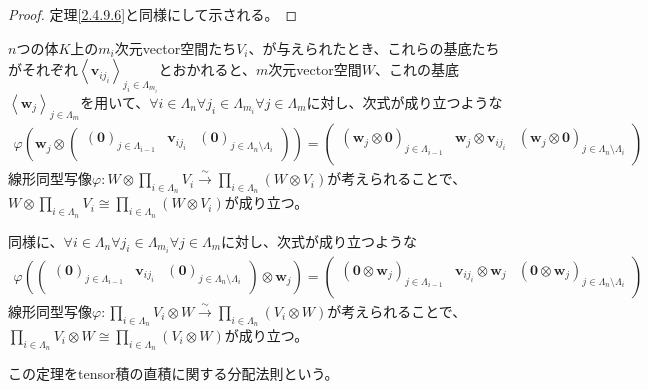 \documentclass[dvipdfmx]{jsarticle}
\begin{document}
\begin{proof} 定理\ref{2.4.9.6}と同様にして示される。
\end{proof}
\begin{thm}[tensor積の直積に関する分配法則]\label{2.4.9.15}
$n$つの体$K$上の$m_{i}$次元vector空間たち$V_{i}$、が与えられたとき、これらの基底たちがそれぞれ$\left\langle \mathbf{v}_{ij_{i}} \right\rangle_{j_{i} \in \varLambda_{m_{i}}}$とおかれると、$m$次元vector空間$W$、これの基底$\left\langle \mathbf{w}_{j} \right\rangle_{j \in \varLambda_{m}}$を用いて、$\forall i \in \varLambda_{n}\forall j_{i} \in \varLambda_{m_{i}}\forall j \in \varLambda_{m}$に対し、次式が成り立つような
\begin{align*}
\varphi\left( \mathbf{w}_{j} \otimes \begin{pmatrix}
\left( \mathbf{0} \right)_{j \in \varLambda_{i - 1}} & \mathbf{v}_{ij_{i}} & \left( \mathbf{0} \right)_{j \in \varLambda_{n} \setminus \varLambda_{i}} \\
\end{pmatrix} \right) = \begin{pmatrix}
\left( \mathbf{w}_{j} \otimes \mathbf{0} \right)_{j \in \varLambda_{i - 1}} & \mathbf{w}_{j} \otimes \mathbf{v}_{ij_{i}} & \left( \mathbf{w}_{j} \otimes \mathbf{0} \right)_{j \in \varLambda_{n} \setminus \varLambda_{i}} \\
\end{pmatrix}
\end{align*}
線形同型写像$\varphi:W \otimes \prod_{i \in \varLambda_{n}} V_{i}\overset{\sim}{\rightarrow}\prod_{i \in \varLambda_{n}} \left( W \otimes V_{i} \right)$が考えられることで、$W \otimes \prod_{i \in \varLambda_{n}} V_{i} \cong \prod_{i \in \varLambda_{n}} \left( W \otimes V_{i} \right)$が成り立つ。\par
同様に、$\forall i \in \varLambda_{n}\forall j_{i} \in \varLambda_{m_{i}}\forall j \in \varLambda_{m}$に対し、次式が成り立つような
\begin{align*}
\varphi\left( \begin{pmatrix}
\left( \mathbf{0} \right)_{j \in \varLambda_{i - 1}} & \mathbf{v}_{ij_{i}} & \left( \mathbf{0} \right)_{j \in \varLambda_{n} \setminus \varLambda_{i}} \\
\end{pmatrix} \otimes \mathbf{w}_{j} \right) = \begin{pmatrix}
\left( \mathbf{0} \otimes \mathbf{w}_{j} \right)_{j \in \varLambda_{i - 1}} & \mathbf{v}_{ij_{i}} \otimes \mathbf{w}_{j} & \left( \mathbf{0} \otimes \mathbf{w}_{j} \right)_{j \in \varLambda_{n} \setminus \varLambda_{i}} \\
\end{pmatrix}
\end{align*}
線形同型写像$\varphi:\prod_{i \in \varLambda_{n}} V_{i} \otimes W\overset{\sim}{\rightarrow}\prod_{i \in \varLambda_{n}} \left( V_{i} \otimes W \right)$が考えられることで、$\prod_{i \in \varLambda_{n}} V_{i} \otimes W \cong \prod_{i \in \varLambda_{n}} \left( V_{i} \otimes W \right)$が成り立つ。\par
この定理をtensor積の直積に関する分配法則という。
\end{thm}
\end{document}
